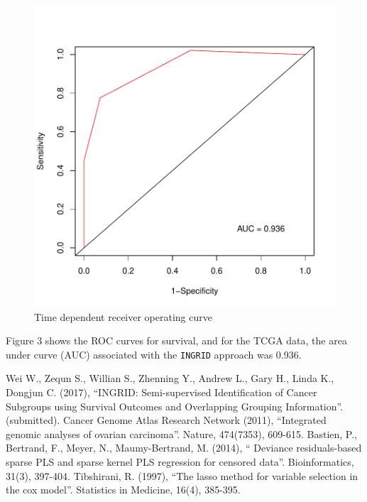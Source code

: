 \documentclass[11pt]{article}
\begin{document}
\begin{figure}[tbh]
\begin{center}
\includegraphics{INGRID-example-plot3}
\caption{Time dependent receiver operating curve}
\end{center}
\end{figure}

Figure 3 shows the ROC curves for survival, and for the TCGA data, the area under curve (AUC) associated with the \texttt{INGRID} approach was 0.936.

\begin{thebibliography}{99}
 Wei W., Zequn S., Willian S., Zhenning Y., Andrew L., Gary H., Linda K., Dongjun C. (2017), ``INGRID: Semi-supervised Identification of Cancer Subgroups using Survival Outcomes and Overlapping Grouping Information''. (submitted).
 Cancer Genome Atlas Research Network (2011), ``Integrated genomic analyses of ovarian carcinoma''. Nature, 474(7353), 609-615.
 Bastien, P., Bertrand, F., Meyer, N., Maumy-Bertrand, M. (2014), `` Deviance residuals-based sparse PLS and sparse kernel PLS regression for censored data''. Bioinformatics, 31(3), 397-404.
 Tibshirani, R. (1997), ``The lasso method for variable selection in the cox model''. Statistics in Medicine, 16(4), 385-395.
\end{thebibliography}
\end{document}
